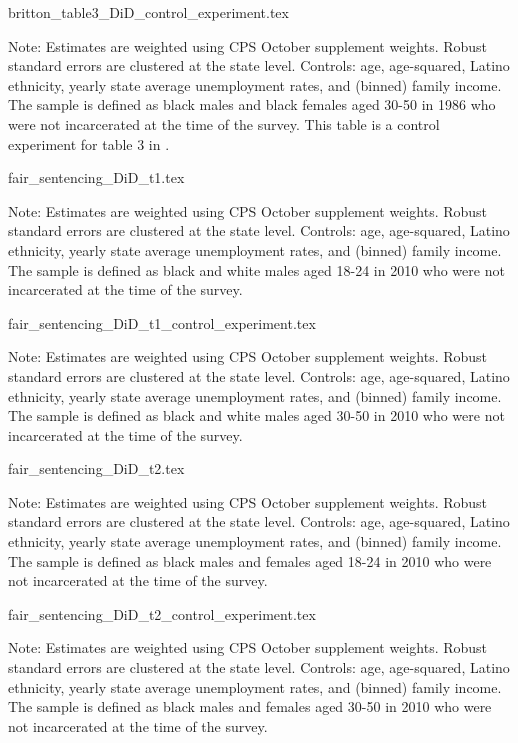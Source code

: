 {britton_table3_DiD_control_experiment.tex}
\begin{footnotesize}
  \noindent Note: Estimates are weighted using CPS October supplement weights. Robust standard errors are clustered at the state level. Controls: age, age-squared, Latino ethnicity, yearly state average unemployment rates, and (binned) family income. The sample is defined as black males and black females aged 30-50 in 1986 who were not incarcerated at the time of the survey.
  This table is a control experiment for table 3 in \cite{britton2022}.
\end{footnotesize}
\clearpage

{fair_sentencing_DiD_t1.tex}
\begin{footnotesize}
  \noindent Note: Estimates are weighted using CPS October supplement weights. Robust standard errors are clustered at the state level. Controls: age, age-squared, Latino ethnicity, yearly state average unemployment rates, and (binned) family income. The sample is defined as black and white males aged 18-24 in 2010 who were not incarcerated at the time of the survey.
\end{footnotesize}

{fair_sentencing_DiD_t1_control_experiment.tex}
\begin{footnotesize}
  \noindent Note: Estimates are weighted using CPS October supplement weights. Robust standard errors are clustered at the state level. Controls: age, age-squared, Latino ethnicity, yearly state average unemployment rates, and (binned) family income. The sample is defined as black and white males aged 30-50 in 2010 who were not incarcerated at the time of the survey.
\end{footnotesize}
\clearpage

{fair_sentencing_DiD_t2.tex}
\begin{footnotesize}
  \noindent Note: Estimates are weighted using CPS October supplement weights. Robust standard errors are clustered at the state level. Controls: age, age-squared, Latino ethnicity, yearly state average unemployment rates, and (binned) family income. The sample is defined as black males and females aged 18-24 in 2010 who were not incarcerated at the time of the survey.
\end{footnotesize}

{fair_sentencing_DiD_t2_control_experiment.tex}
\begin{footnotesize}
  \noindent Note: Estimates are weighted using CPS October supplement weights. Robust standard errors are clustered at the state level. Controls: age, age-squared, Latino ethnicity, yearly state average unemployment rates, and (binned) family income. The sample is defined as black males and females aged 30-50 in 2010 who were not incarcerated at the time of the survey.
\end{footnotesize}
\clearpage

